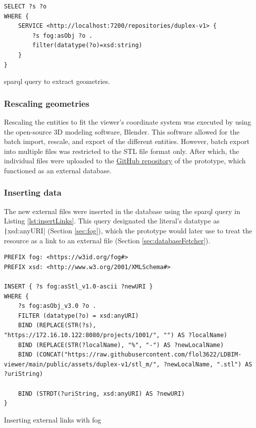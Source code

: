 \begin{listing}[H]
    \begin{verbatim}
SELECT ?s ?o
WHERE {
    SERVICE <http://localhost:7200/repositories/duplex-v1> {
        ?s fog:asObj ?o .
        filter(datatype(?o)=xsd:string)
    }
}
    \end{verbatim}
    \caption{\acs{sparql} query to extract geometries.}
    \label{lst:extractGeometries}
\end{listing}


\subsubsection{Rescaling geometries}
Rescaling the entities to fit the viewer's coordinate system was executed by using the open-source 3D modeling software, Blender. This software allowed for the batch import, rescale, and export of the different entities. However, batch export into multiple files was restricted to the STL file format only. After which, the individual files were uploaded to the \href{https://github.com/flol3622/LDBIM-viewer}{GitHub repository} of the prototype, which functioned as an external database.

\subsubsection{Inserting data}

The new external files were inserted in the database using the \ac{sparql} query in Listing \ref{lst:insertLinks}. This query designated the literal's datatype as \texttt|xsd:anyURI| (Section \ref{sec:fog}), which the prototype would later use to treat the resource as a link to an external file (Section \ref{sec:databaseFetcher}).

\begin{listing}[H]
    \begin{verbatim}
PREFIX fog: <https://w3id.org/fog#>
PREFIX xsd: <http://www.w3.org/2001/XMLSchema#>

INSERT { ?s fog:asStl_v1.0-ascii ?newURI }
WHERE { 
    ?s fog:asObj_v3.0 ?o .
    FILTER (datatype(?o) = xsd:anyURI)
    BIND (REPLACE(STR(?s), "https://172.16.10.122:8080/projects/1001/", "") AS ?localName)
    BIND (REPLACE(STR(?localName), "%", "-") AS ?newLocalName)
    BIND (CONCAT("https://raw.githubusercontent.com/flol3622/LDBIM-viewer/main/public/assets/duplex-v1/stl_m/", ?newLocalName, ".stl") AS ?uriString)
    
    BIND (STRDT(?uriString, xsd:anyURI) AS ?newURI)
}
    \end{verbatim}
    \caption{Inserting external links with \acs{fog}}
    \label{lst:insertLinks}
\end{listing}

